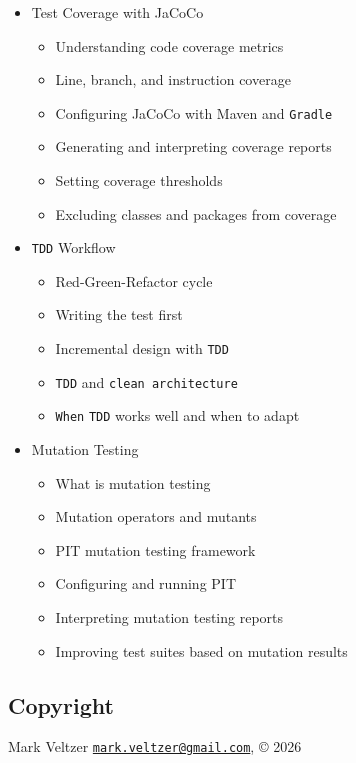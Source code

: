 \documentclass[
]{article}
\providecommand{\tightlist}{%
  \setlength{\itemsep}{0pt}\setlength{\parskip}{0pt}}
\begin{document}
\begin{itemize}
  \begin{itemize}
  \tightlist
  \item
    Introduction to \texttt{TestContainers}
  \item
    Setting up containerized databases for tests
  \item
    \texttt{TestContainers} with \texttt{JUnit\ 5}
  \item
    Custom container definitions
  \item
    \texttt{TestContainers} with \texttt{Spring\ Boot}
  \item
    Testing with \texttt{Kafka}, \texttt{Redis}, and other services
  \end{itemize}
\item
  Test Coverage with JaCoCo

  \begin{itemize}
  \tightlist
  \item
    Understanding code coverage metrics
  \item
    Line, branch, and instruction coverage
  \item
    Configuring JaCoCo with Maven and \texttt{Gradle}
  \item
    Generating and interpreting coverage reports
  \item
    Setting coverage thresholds
  \item
    Excluding classes and packages from coverage
  \end{itemize}
\item
  \texttt{TDD} Workflow

  \begin{itemize}
  \tightlist
  \item
    Red-Green-Refactor cycle
  \item
    Writing the test first
  \item
    Incremental design with \texttt{TDD}
  \item
    \texttt{TDD} and \texttt{clean\ architecture}
  \item
    \texttt{When} \texttt{TDD} works well and when to adapt
  \end{itemize}
\item
  Mutation Testing

  \begin{itemize}
  \tightlist
  \item
    What is mutation testing
  \item
    Mutation operators and mutants
  \item
    PIT mutation testing framework
  \item
    Configuring and running PIT
  \item
    Interpreting mutation testing reports
  \item
    Improving test suites based on mutation results
  \end{itemize}
\end{itemize}

\subsection{Copyright}\label{copyright}

Mark Veltzer
\href{mailto:mark.veltzer@gmail.com}{\nolinkurl{mark.veltzer@gmail.com}},
© 2026
\end{document}
